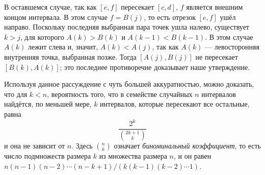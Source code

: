 В оставшемся случае, так как $[e, f]$ пересекает $[c, d]$, $f$ является внешним концом интервала. 
В этом случае $f=B(j)$, то есть отрезок $[e, f]$ ушёл направо.
Поскольку последняя выбранная пара точек ушла налево, существует $k>j$, для которого $A(k)>B(k)$ и $A(k-1)<B(k-1)$.
В этом случае $A(k)$ лежит слева и, значит, $A(k) < A(j)$, так как $A(k)$ --- левосторонняя внутренняя точка, выбранная позже.
Тогда $[A(j), B(j)]$ не пересекает $[B(k), A(k)]$; это последнее противоречие доказывает наше утверждение.
\heart

Используя данное рассуждение с чуть большей аккуратностью, можно доказать, что 
для $k < n$, вероятность того, что в семействе случайных $n$ интервалов найдётся, по меньшей мере, $k$ интервалов, которые пересекают все остальные, равна
\[\frac{2^k}{\binom{2k+1} k}\]
и она не зависит от $n$.
Здесь $\binom n k$ означает \emph{биноминальный коэффициент}, то есть число подмножеств размера $k$ из множества размера $n$, и он равен $n(n-1)(n-2)\cdots(n-k+1) /(k(k-1)(k-2)\cdots1)$.
